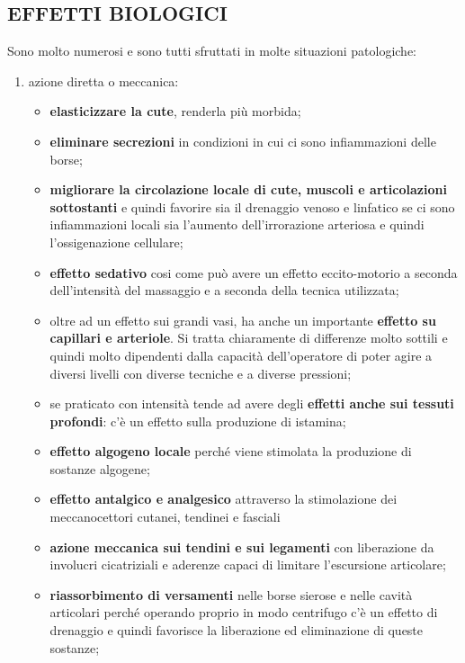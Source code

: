 \subsection{EFFETTI BIOLOGICI}


Sono molto numerosi e sono tutti sfruttati in molte situazioni
patologiche:

\begin{enumerate}
\def\labelenumi{\arabic{enumi}.}
\item
  azione diretta o meccanica:


\begin{itemize}
\item
  \textbf{elasticizzare la cute}, renderla più morbida;
\item
  \textbf{eliminare secrezioni} in condizioni in cui ci sono
  infiammazioni delle borse;
\item
  \textbf{migliorare la circolazione locale di cute, muscoli e
  articolazioni sottostanti} e quindi favorire sia il drenaggio venoso e
  linfatico se ci sono infiammazioni locali sia l'aumento
  dell'irrorazione arteriosa e quindi l'ossigenazione cellulare;
\item
  \textbf{effetto sedativo} cosi come può avere un effetto
  eccito-motorio a seconda dell'intensità del massaggio e a seconda
  della tecnica utilizzata;
\item
  oltre ad un effetto sui grandi vasi, ha anche un importante
  \textbf{effetto su capillari e arteriole}. Si tratta chiaramente di
  differenze molto sottili e quindi molto dipendenti dalla capacità
  dell'operatore di poter agire a diversi livelli con diverse tecniche e
  a diverse pressioni;
\item
  se praticato con intensità tende ad avere degli \textbf{effetti anche
  sui tessuti profondi}: c'è un effetto sulla produzione di istamina;
\item
  \textbf{effetto algogeno locale} perché viene stimolata la produzione
  di sostanze algogene;
\item
  \textbf{effetto antalgico e analgesico} attraverso la stimolazione dei
  meccanocettori cutanei, tendinei e fasciali
\item
  \textbf{azione meccanica sui tendini e sui legamenti} con liberazione
  da involucri cicatriziali e aderenze capaci di limitare l'escursione
  articolare;
\item

  \textbf{riassorbimento di versamenti} nelle borse sierose e nelle
  cavità articolari perché operando proprio in modo centrifugo c'è un
  effetto di drenaggio e quindi favorisce la liberazione ed eliminazione
  di queste sostanze;


\end{itemize}
\end{enumerate}

